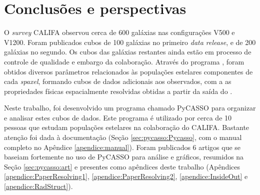 



\chapter{Conclusões e perspectivas}
\label{sec:conclusao}

O {\em survey} CALIFA observou cerca de 600 galáxias nas configurações V500 e
V1200. Foram publicados cubos de 100 galáxias no primeiro {\em data release}, e
de 200 galáxias no segundo. Os cubos das galáxias restantes ainda estão em
processo de controle de qualidade e embargo da colaboração. Através do programa
\starlight, foram obtidos diversos parâmetros relacionados às populações
estelares componentes de cada {\em spaxel}, formando cubos de dados adicionais
aos observados, com a as propriedades físicas espacialmente resolvidas obtidas a
partir da saída do \starlight.	

Neste trabalho, foi desenvolvido um programa chamado PyCASSO para organizar e
analisar estes cubos de dados. Este programa é utilizado por cerca de 10 pessoas
que estudam populações estelares na colaboração do CALIFA. Bastante atenção foi
dada à documentação (Seção \ref{sec:pycasso:Pycasso}, com o manual completo no
Apêndice \ref{apendice:manual}). Foram publicados 6 artigos que se baseiam
fortemente no uso de PyCASSO para análise e gráficos, resumidos na Seção
\ref{sec:pycasso:art} e presentes como apêndices deste trabalho (Apêndices
\ref{apendice:PaperResolving1}, \ref{apendice:PaperResolving2},
\ref{apendice:InsideOut} e \ref{apendice:RadStruct}).

